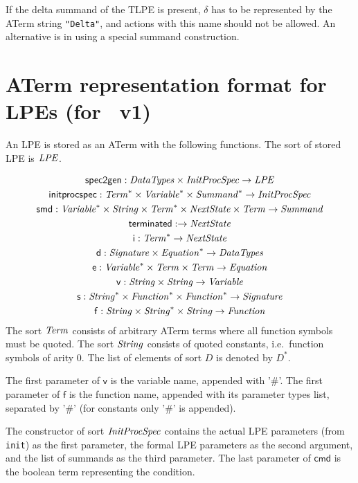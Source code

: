 \documentclass[fleqn,a4paper,dvips]{article}
\newcommand{\aterm}[1]{\mathsf{#1}}
\newcommand{\afunc}[3]{\aterm{#1}:#2\rightarrow#3}
\begin{document}
{If the delta summand of the TLPE is present, $\delta$ has to be
represented by the ATerm string \texttt{"Delta"}, and actions with
this name should not be allowed.  An alternative is in using a special
summand construction.

\newpage
\section{ATerm representation format for LPEs (for \mcrl\ v1)}
An LPE is stored as an ATerm with the following functions. The sort
of stored LPE is $\mathit{LPE}$.

\begin{gather*}
\afunc{spec2gen}{\nm{DataTypes}\x\nm{InitProcSpec}}{\nm{LPE}}\\
\afunc{initprocspec}{\nm{Term}^*\x\nm{Variable}^*\x\nm{Summand}^*}{\nm{InitProcSpec}}\\
\afunc{smd}{\nm{Variable}^*\x\nm{String}\x\nm{Term}^*\x\nm{NextState}\x\nm{Term}}{\nm{Summand}}\\
\afunc{terminated}{}{\nm{NextState}}\\
\afunc{i}{\nm{Term}^*}{\nm{NextState}}\\
\afunc{d}{\nm{Signature}\x\nm{Equation}^*}{\nm{DataTypes}}\\
\afunc{e}{\nm{Variable}^*\x\nm{Term}\x\nm{Term}}{\nm{Equation}}\\
\afunc{v}{\nm{String}\x\nm{String}}{\nm{Variable}}\\
\afunc{s}{\nm{String}^*\x\nm{Function}^*\x\nm{Function}^*}{\nm{Signature}}\\
\afunc{f}{\nm{String}\x\nm{String}^{*}\x\nm{String}}{\nm{Function}}
\end{gather*}
The sort $\mathit{Term}$ consists of arbitrary ATerm terms where all function
symbols must be quoted. The sort $\mathit{String}$ consists of quoted constants,
i.e.\ function symbols of arity 0. The list
of elements of sort $D$ is denoted by $D^{*}$.

The first parameter of $\mathsf{v}$ is the variable name, appended with '\#'.
The first parameter of $\mathsf{f}$ is the function name, appended 
with its parameter types list, separated by '\#' (for constants only '\#' is appended).

The constructor of sort $\mathit{InitProcSpec}$ contains the actual LPE
parameters (from \texttt{init}) as the first parameter, the formal LPE
parameters as the second argument, and the list of summands as the
third parameter. The last parameter of $\mathsf{cmd}$ is the boolean term
representing the condition.

}
\end{document}

